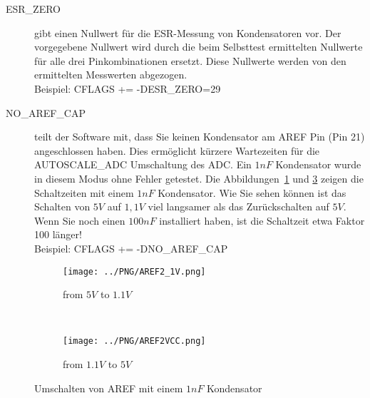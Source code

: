 \begin{description}
  \item[ESR\_ZERO] gibt einen Nullwert für die ESR-Messung von Kondensatoren vor.
Der vorgegebene Nullwert wird durch die beim Selbsttest ermittelten Nullwerte für alle drei Pinkombinationen ersetzt.
 Diese Nullwerte werden von den ermittelten Messwerten abgezogen.\\
Beispiel: CFLAGS += -DESR\_ZERO=29

  \item[NO\_AREF\_CAP] teilt der Software mit, dass Sie keinen Kondensator am AREF Pin (Pin 21) angeschlossen haben.
Dies ermöglicht kürzere Wartezeiten für die AUTOSCALE\_ADC Umschaltung des ADC.
Ein \(1nF\) Kondensator wurde in diesem Modus ohne Fehler getestet.
Die Abbildungen~\ref{pic:aref1} und \ref{pic:aref5} zeigen die Schaltzeiten mit einem \(1nF\) Kondensator.
Wie Sie sehen können ist das Schalten von \(5V\) auf \(1,1V\) viel langsamer als das Zurückschalten auf \(5V\).
Wenn Sie noch einen \(100nF\) installiert haben, ist die Schaltzeit etwa Faktor 100 länger!\\
Beispiel: CFLAGS += -DNO\_AREF\_CAP

\end{description}

\begin{figure}[H]
  \begin{subfigure}[b]{8.6cm}
    \centering
    \texttt{[image: ../PNG/AREF2\_1V.png]}
    \caption{from \(5V\) to \(1.1V\) }
    \label{pic:aref1}
  \end{subfigure}
  ~
  \begin{subfigure}[b]{8.6cm}
    \centering
    \texttt{[image: ../PNG/AREF2VCC.png]}
    \caption{from \(1.1V\) to \(5V\)}
    \label{pic:aref5}
  \end{subfigure}
  \caption{Umschalten von AREF mit einem \(1nF\) Kondensator}
\end{figure}

